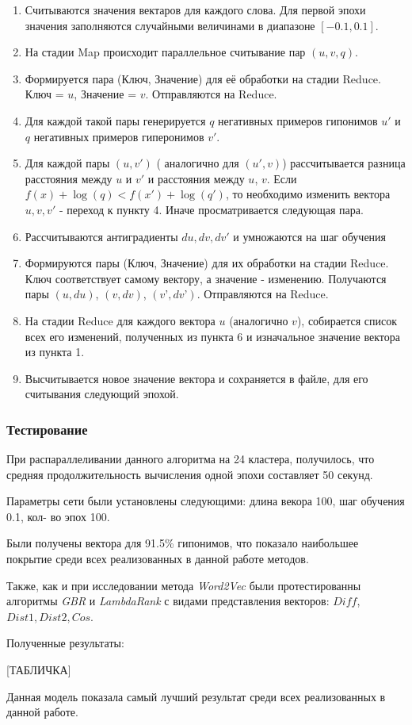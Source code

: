 \begin{enumerate}
\item Считываются значения вектаров для каждого слова. Для первой эпохи значения
заполняются случайными величинами в диапазоне $[-0.1, 0.1]$.

\item На стадии Map происходит параллельное считывание пар $(u, v, q)$.

\item Формируется пара (Ключ, Значение) для её обработки на стадии Reduce. Ключ = $u$,
Значение = $v$. Отправляются на Reduce.

\item Для каждой такой пары генерируется $q$ негативных примеров гипонимов $u'$ и $q$
негативных примеров гиперонимов $v'$.

\item Для каждой пары $(u, v')$ ( аналогично для $(u', v)$) рассчитывается разница расстояния между $u$ и $v'$ и расстояния между $u$, $v$. Если $f(x) + \log(q) < f(x') + \log(q')$, то необходимо изменить вектора $u, v, v'$ - переход к пункту 4. Иначе просматривается следующая
пара.

\item Рассчитываются антиградиенты $du, dv, dv'$ и умножаются на шаг обучения

\item Формируются пары (Ключ, Значение) для их обработки на стадии Reduce. Ключ
соответствует самому вектору, а значение - изменению. Получаются пары $(u, du)$, $(v,
dv)$, $(v’, dv’)$. Отправляются на Reduce.

\item На стадии Reduce для каждого вектора $u$ (аналогично $v$), собирается список всех
его изменений, полученных из пункта 6 и изначальное значение вектора из пункта 1.

\item Высчитывается новое значение вектора и сохраняется в файле, для его считывания
следующий эпохой.
\end{enumerate}


\subsubsection{Тестирование}

При распараллеливании данного алгоритма на 24 кластера, получилось, что средняя
продолжительность вычисления одной эпохи составляет 50 секунд.

Параметры сети были установлены следующими: длина векора 100, шаг обучения 0.1, кол-
во эпох 100.

Были получены вектора для 91.5\% гипонимов, что показало наибольшее покрытие среди
всех реализованных в данной работе методов.

Также, как и при исследовании метода \textit{Word2Vec} были протестированны алгоритмы \textit{GBR} и \textit{LambdaRank} с видами представления векторов: $Diff$,\newline $Dist1, Dist2, Cos$.

Полученные результаты:

[ТАБЛИЧКА]

Данная модель показала самый лучший результат среди всех реализованных в данной работе.